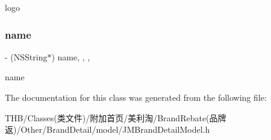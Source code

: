 logo \mbox{\label{interface_j_m_brand_detail_info_model_aa73468ebf7e52379037a946ce0d2f605}} 
\subsubsection{\texorpdfstring{name}{name}}
{\footnotesize\ttfamily -\/ (N\+S\+String$\ast$) name\hspace{0.3cm}{\ttfamily [read]}, {\ttfamily [write]}, {\ttfamily [nonatomic]}, {\ttfamily [copy]}}

name 

The documentation for this class was generated from the following file\+:\begin{DoxyCompactItemize}
\item 
T\+H\+B/\+Classes(类文件)/附加首页/美利淘/\+Brand\+Rebate(品牌返)/\+Other/\+Brand\+Detail/model/J\+M\+Brand\+Detail\+Model.\+h\end{DoxyCompactItemize}
